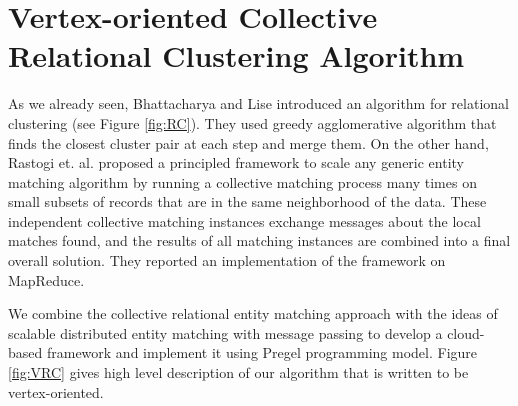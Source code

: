 \section{Vertex-oriented Collective Relational Clustering Algorithm}
As we already seen, Bhattacharya and Lise \cite{BhGe07} introduced an algorithm for relational clustering (see Figure \ref{fig:RC}). They used greedy agglomerative algorithm that finds the closest cluster pair at each step and merge them. On the other hand, Rastogi et. al. \cite{RDGa11} proposed a principled framework to scale any generic entity matching algorithm by running a collective matching process many times on small subsets of records that are in the same neighborhood of the data. These independent collective matching instances exchange messages about the local matches found, and the results of all matching instances are combined into a final overall solution\cite{Chri12}. They reported an implementation of the framework on MapReduce.

We combine the collective relational entity matching approach with the ideas of scalable distributed entity matching with message passing to develop a cloud-based framework and implement it using Pregel programming model. Figure \ref{fig:VRC} gives high level description of our algorithm that is written to be vertex-oriented.

